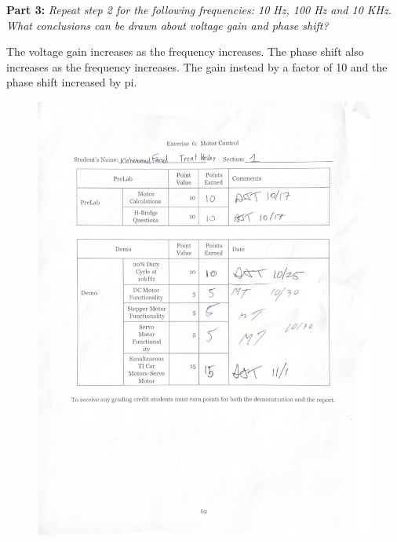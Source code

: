 \documentclass[CMPE]{KGCOEReport}
\begin{document}
\textbf{Part 3:} \emph{Repeat step 2 for the following frequencies: 10 Hz, 100 Hz and 10 KHz. What conclusions can be drawn about voltage gain and phase shift?}

The voltage gain increases as the frequency increases. The phase shift also increases as the frequency increases. The gain instead by a factor of 10 and the phase shift increased by pi.

\newpage
\begin{figure}[H]
    \centering
    \begin{adjustbox}{center}
        \includegraphics[width=1.26\textwidth]{signoff.pdf}
    \end{adjustbox}
\end{figure}
\end{document}
